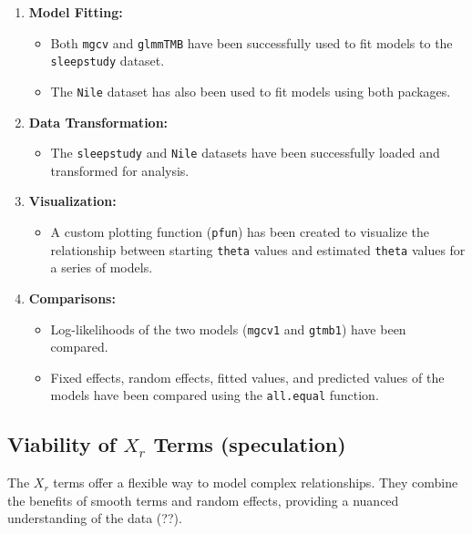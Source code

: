 \begin{enumerate}[label=\arabic*.]
    \item \textbf{Model Fitting:}
    \begin{itemize}
        \item Both \texttt{mgcv} and \texttt{glmmTMB} have been successfully used to fit models to the \texttt{sleepstudy} dataset.
        \item The \texttt{Nile} dataset has also been used to fit models using both packages.
    \end{itemize}
    
    \item \textbf{Data Transformation:}
    \begin{itemize}
        \item The \texttt{sleepstudy} and \texttt{Nile} datasets have been successfully loaded and transformed for analysis.
    \end{itemize}
    
    \item \textbf{Visualization:}
    \begin{itemize}
        \item A custom plotting function (\texttt{pfun}) has been created to visualize the relationship between starting \texttt{theta} values and estimated \texttt{theta} values for a series of models.
    \end{itemize}
    
    \item \textbf{Comparisons:}
    \begin{itemize}
        \item Log-likelihoods of the two models (\texttt{mgcv1} and \texttt{gtmb1}) have been compared.
        \item Fixed effects, random effects, fitted values, and predicted values of the models have been compared using the \texttt{all.equal} function.
    \end{itemize}
\end{enumerate}


\subsection{Viability of \(X_r\) Terms (speculation)}

The \(X_r\) terms offer a flexible way to model complex relationships. They combine the benefits of smooth terms and random effects, providing a nuanced understanding of the data (??).

